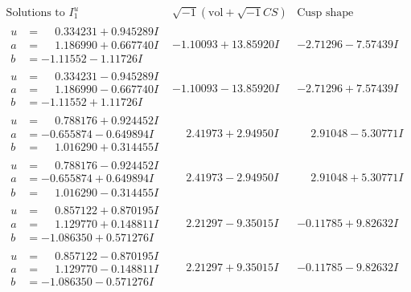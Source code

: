\documentclass[1p]{elsarticle_modified}
\theoremstyle{definition}
\newcommand{\I}{\sqrt{-1}}
\begin{document}
$$\begin{array}{c|c|c}  
\text{Solutions to }I^u_{1}& \I (\text{vol} + \sqrt{-1}CS) & \text{Cusp shape}\\
 \hline 
\begin{aligned}
u &= \phantom{-}0.334231 + 0.945289 I \\
a &= \phantom{-}1.186990 + 0.667740 I \\
b &= -1.11552 - 1.11726 I\end{aligned}
 & -1.10093 + 13.85920 I & -2.71296 - 7.57439 I \\ \hline\begin{aligned}
u &= \phantom{-}0.334231 - 0.945289 I \\
a &= \phantom{-}1.186990 - 0.667740 I \\
b &= -1.11552 + 1.11726 I\end{aligned}
 & -1.10093 - 13.85920 I & -2.71296 + 7.57439 I \\ \hline\begin{aligned}
u &= \phantom{-}0.788176 + 0.924452 I \\
a &= -0.655874 - 0.649894 I \\
b &= \phantom{-}1.016290 + 0.314455 I\end{aligned}
 & \phantom{-}2.41973 + 2.94950 I & \phantom{-}2.91048 - 5.30771 I \\ \hline\begin{aligned}
u &= \phantom{-}0.788176 - 0.924452 I \\
a &= -0.655874 + 0.649894 I \\
b &= \phantom{-}1.016290 - 0.314455 I\end{aligned}
 & \phantom{-}2.41973 - 2.94950 I & \phantom{-}2.91048 + 5.30771 I \\ \hline\begin{aligned}
u &= \phantom{-}0.857122 + 0.870195 I \\
a &= \phantom{-}1.129770 + 0.148811 I \\
b &= -1.086350 + 0.571276 I\end{aligned}
 & \phantom{-}2.21297 - 9.35015 I & -0.11785 + 9.82632 I \\ \hline\begin{aligned}
u &= \phantom{-}0.857122 - 0.870195 I \\
a &= \phantom{-}1.129770 - 0.148811 I \\
b &= -1.086350 - 0.571276 I\end{aligned}
 & \phantom{-}2.21297 + 9.35015 I & -0.11785 - 9.82632 I \\ \hline\begin{aligned}

\end{aligned}
\end{array}$$
\end{document}
